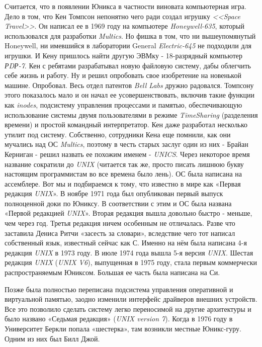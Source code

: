 Считается, что в появлении Юникса в частности виновата компьютерная игра. Дело в том, что Кен Томпсон непонятно чего ради создал игрушку \textit{<<Space Travel>>}. Он написал ее в 1969 году на компьютере \textit{Honeywell-635}, который использовался для разработки \textit{Multics}. Но фишка в том, что ни вышеупомянутый Honeywell, ни имевшийся в лаборатории General \textit{Electric-645} не подходили для игрушки. И Кену пришлось найти другую ЭВМку - 18-разрядный компьютер \textit{РDР-7}. Кен с ребятами разрабатывал новую файловую систему, дабы облегчить себе жизнь и работу. Ну и решил опробовать свое изобретение на новенькой машине. Опробовал. Весь отдел патентов \textit{Bell Labs} дружно радовался. Томпсону этого показалось мало и он начал ее усовершенствовать, включив такие функции как \textit{inodes}, подсистему управления процессами и памятью, обеспечивающую использование системы двумя пользователями в режиме \textit{TimeSharing} (разделения времени) и простой командный интерпретатор. Кен даже разработал несколько утилит под систему. Собственно, сотрудники Кена еще помнили, как они мучались над ОС \textit{Multics}, поэтому в честь старых заслуг один из них - Брайан Керниган - решил назвать ее похожим именем - \textit{UNICS}. Через некоторое время название сократили до \textit{UNIX} (читается так же, просто писать лишнюю букву настоящим программистам во все времена было лень). ОС была написана на ассемблере. Вот мы и подбираемся к тому, что известно в мире как «Первая редакция \textit{UNIX}». В ноябре 1971 года был опубликован первый выпуск полноценной доки по Юниксу. В соответствии с этим и ОС была названа «Первой редакцией \textit{UNIX}». Вторая редакция вышла довольно быстро - меньше, чем через год. Третья редакция ничем особенным не отличалась. Разве что заставила Дениса Ритчи «засесть за словари», вследствие чего тот написал собственный язык, известный сейчас как С. Именно на нём была написана 4-я редакция \textit{UNIX} в 1973 году. В июле 1974 года вышла 5-я версия \textit{UNIX}. Шестая редакция \textit{UNIX} (\textit{UNIX V6}), выпущенная в 1975 году, стала первым коммерчески распространяемым Юниксом. Большая ее часть была написана на Си.

Позже была полностью переписана подсистема управления оперативной и виртуальной памятью, заодно изменили интерфейс драйверов внешних устройств. Все это позволило сделать систему легко переносимой на другие архитектуры и было названо «Седьмая редакция» (\textit{UNIX version 7}). Когда в 1976 году в Университет Беркли попала «шестерка», там возникли местные Юникс-гуру. Одним из них был Билл Джой.

